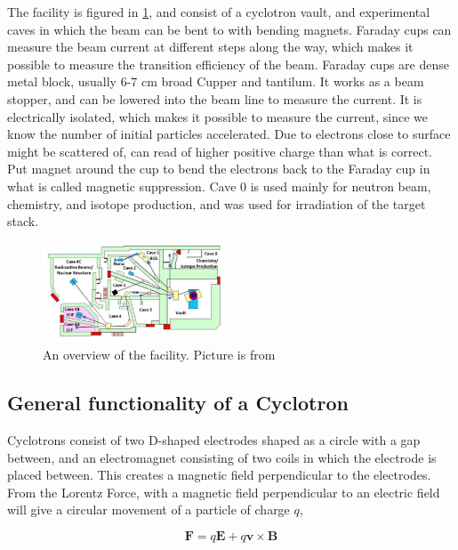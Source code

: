 \documentclass[a4paper,11pt,twoside]{book}
\begin{document}
\noindent
The  facility is figured in \ref{fig:LBNL_88}, and consist of a cyclotron vault, and experimental caves in which the beam can be bent to with bending magnets. Faraday cups can measure the beam current at different steps along the way, which makes it possible to measure the transition efficiency of the beam. Faraday cups are dense metal block, usually 6-7 cm broad Cupper and tantilum. It works as a beam stopper, and can be lowered into the beam line to measure the current. It is electrically isolated, which makes it possible to measure the current, since we know the number of initial particles accelerated. Due to electrons close to surface might be scattered of, can read of higher positive charge than what is correct. Put magnet around the cup to bend the electrons back to the Faraday cup in what is called magnetic suppression.
\noindent
Cave 0 is used mainly for neutron beam, chemistry, and isotope production, and was used for irradiation of the target stack. 

\begin{figure}
    \centering
    \includegraphics[width=0.5\textwidth]{Experiment/LBL_88.png}
    \caption{An overview of the facility.  Picture is from \cite{KireeffCovo2018}}
    \label{fig:LBNL_88}
\end{figure}

\subsection{General functionality of a Cyclotron}
Cyclotrons consist of two D-shaped electrodes shaped as a circle with a gap between, and an electromagnet consisting of two coils in which the electrode is placed between. This creates a magnetic field perpendicular to the electrodes. 
From the Lorentz Force, with a magnetic field perpendicular to an electric field will give a circular movement of a particle of charge $q$,

\begin{equation} \label{eq:Lorentz}
    \textbf{F} = q\textbf{E} + q\textbf{v} \times \textbf{B}
\end{equation}
\end{document}
